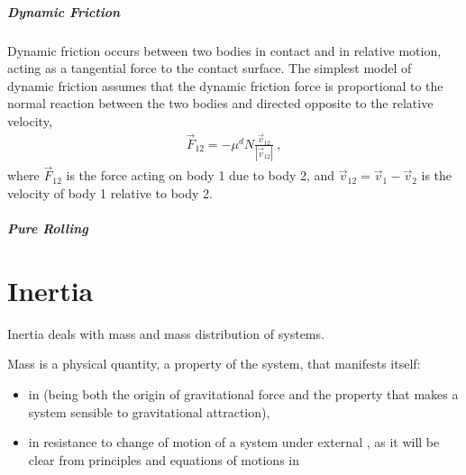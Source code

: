 \documentclass[letterpaper,10pt,english]{jupyterBook}
\begin{document}
\paragraph{Dynamic Friction}
\label{\detokenize{ch/actions-reactions:dynamic-friction}}\label{\detokenize{ch/actions-reactions:classical-mechanics-actions-reactions-contact-friction-dynamic}}
\sphinxAtStartPar
Dynamic friction occurs between two bodies in contact and in relative motion, acting as a tangential force to the contact surface. The simplest model of dynamic friction assumes that the dynamic friction force is proportional to the normal reaction between the two bodies and directed opposite to the relative velocity,
\begin{equation*}
\begin{split}\vec{F}_{12} = - \mu^d N \frac{\vec{v}_{12}}{|\vec{v}_{12}|} \ ,\end{split}
\end{equation*}
\sphinxAtStartPar
where \(\vec{F}_{12}\) is the force acting on body 1 due to body 2, and \(\vec{v}_{12} = \vec{v}_1 - \vec{v}_2\) is the velocity of body 1 relative to body 2.


\paragraph{Pure Rolling}
\label{\detokenize{ch/actions-reactions:pure-rolling}}\label{\detokenize{ch/actions-reactions:classical-mechanics-actions-reactions-contact-friction-pure-rolling}}
\sphinxAtStartPar
{} 

\sphinxstepscope


\chapter{Inertia}
\label{\detokenize{ch/inertia:inertia}}\label{\detokenize{ch/inertia:classical-mechanics-inertia}}\label{\detokenize{ch/inertia::doc}}
\sphinxAtStartPar
Inertia deals with mass and mass distribution of systems.

\sphinxAtStartPar
{} Mass is a physical quantity, a property of the system, that manifests itself:
\begin{itemize}
\item {} 
\sphinxAtStartPar
in {\hyperref[\detokenize{ch/actions-examples:classical-mechanics-actions-gravitation}]{}} (being both the origin of gravitational force and the property that makes a system sensible to gravitational attraction),

\item {} 
\sphinxAtStartPar
in resistance to change of motion of a system under external {\hyperref[\detokenize{ch/actions:classical-mechanics-actions}]{}}, as it will be clear from principles and equations of motions in {\hyperref[\detokenize{ch/dynamics:classical-mechanics-dynamics}]{}}

\end{itemize}
\end{document}
